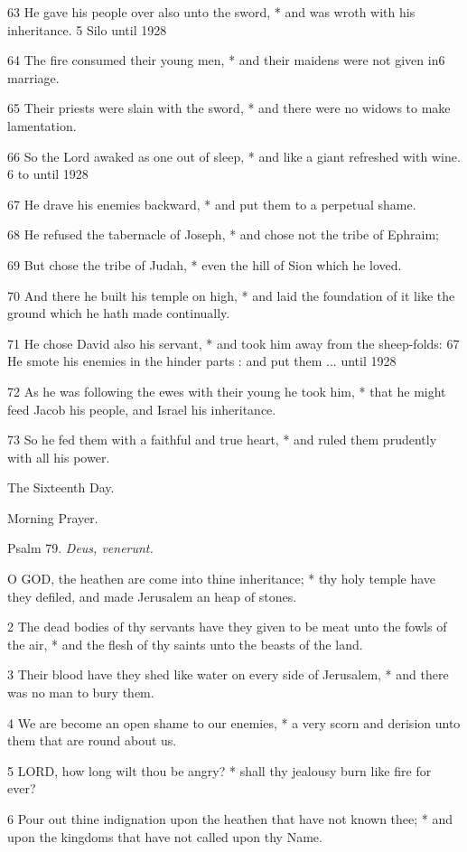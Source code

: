 63 He gave his people over also unto the sword, * and
was wroth with his inheritance. 5 Silo
until 1928

64 The fire consumed their young men, * and their maidens were not given
in6 marriage.

65 Their priests were slain with the sword, * and there
were no widows to make lamentation.

66 So the Lord awaked as one out of sleep, * and like
a giant refreshed with wine. \\
6 to
until 1928

67 He drave his enemies backward, * and put them to a perpetual shame.

68 He refused the tabernacle of Joseph, * and chose not
the tribe of Ephraim;

69 But chose the tribe of Judah, * even the hill of Sion
which he loved.

70 And there he built his temple on high, * and laid
the foundation of it like the ground which he hath made continually.

71 He chose David also his servant, * and took him away
from the sheep-folds: 67 He smote his enemies in
the hinder parts : and put them ...
until 1928

72 As he was following the ewes with their young he took him, * that he
might feed Jacob his people, and Israel his inheritance.

73 So he fed them with a faithful and true heart, *
and ruled them prudently with all his power. 

The
Sixteenth Day.

Morning
Prayer.

Psalm
79. \emph{Deus, venerunt.}

O
GOD, the heathen are come into thine inheritance; * thy holy temple have
they defiled, and made Jerusalem an heap of stones.

2 The dead bodies of thy servants have they given to
be meat unto the fowls of the air, * and the flesh of thy saints unto
the beasts of the land.

3 Their blood have they shed like water on every side
of Jerusalem, * and there was no man to bury them.

4 We are become an open shame to our enemies, * a very
scorn and derision unto them that are round about us.

5 LORD, how long wilt thou be angry? * shall thy jealousy
burn like fire for ever?

6 Pour out thine indignation upon the heathen that
have not known thee; * and upon the kingdoms that have not called upon
thy Name.


